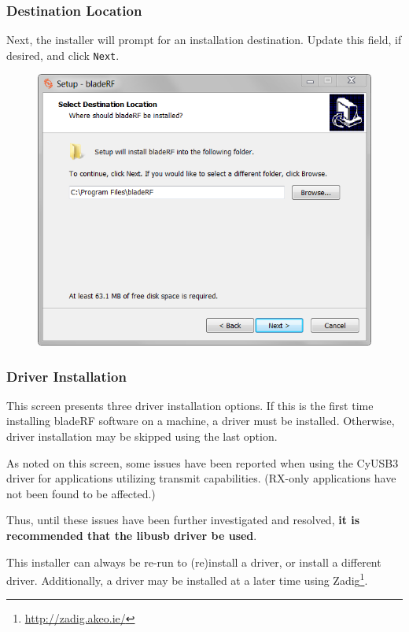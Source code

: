 {\newpage
\subsubsection{Destination Location} \label{sec:dest}
Next, the installer will prompt for an installation destination. Update this field, if desired, and click \texttt{Next}.

\begin{figure}[h]
  \centering
  \includegraphics{images/windows/installer/02-destination.png}
\end{figure}

\newpage
\subsubsection{Driver Installation}

This screen presents three driver installation options. If this is
the first time installing bladeRF software on a machine, a driver must be
installed. Otherwise, driver installation may be skipped using the last option.

As noted on this screen, some issues have been reported when using the CyUSB3
driver for applications utilizing transmit capabilities. (RX-only applications
have not been found to be affected.)

Thus, until these issues have been further investigated and resolved, \textbf{it is recommended that the libusb driver be used}.

This installer can always be re-run to (re)install a driver, or install
a different driver. Additionally, a driver may be installed at a later time
using Zadig\footnote{\url{http://zadig.akeo.ie/}}.


}
